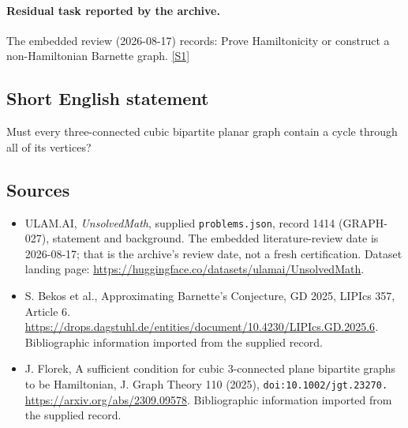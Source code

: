 \documentclass[11pt,a4paper]{article}
\newcommand{\sref}[2]{\hyperlink{source:#1:#2}{[S#2]}}
\begin{document}
\paragraph{Residual task reported by the archive.}

The embedded review (2026-08-17) records: Prove Hamiltonicity or construct a non-Hamiltonian Barnette graph. \sref{1414}{1}

\subsection{Short English statement}

Must every three-connected cubic bipartite planar graph contain a cycle through all of its vertices?

\subsection{Sources}

{\small

\begin{itemize}

\item[\hypertarget{source:1414:1}{S1}] ULAM.AI, \emph{UnsolvedMath}, supplied \texttt{problems.json}, record 1414 (GRAPH-027), statement and background. The embedded literature-review date is 2026-08-17; that is the archive’s review date, not a fresh certification. Dataset landing page: \url{https://huggingface.co/datasets/ulamai/UnsolvedMath}.

\item[\hypertarget{source:1414:2}{S2}] S. Bekos et al., Approximating Barnette's Conjecture, GD 2025, LIPIcs 357, Article 6. \url{https://drops.dagstuhl.de/entities/document/10.4230/LIPIcs.GD.2025.6}. Bibliographic information imported from the supplied record.

\item[\hypertarget{source:1414:3}{S3}] J. Florek, A sufficient condition for cubic 3-connected plane bipartite graphs to be Hamiltonian, J. Graph Theory 110 (2025), \nolinkurl{doi:10.1002/jgt.23270.} \url{https://arxiv.org/abs/2309.09578}. Bibliographic information imported from the supplied record.

\end{itemize}

}

\label{end:1414}
\end{document}
